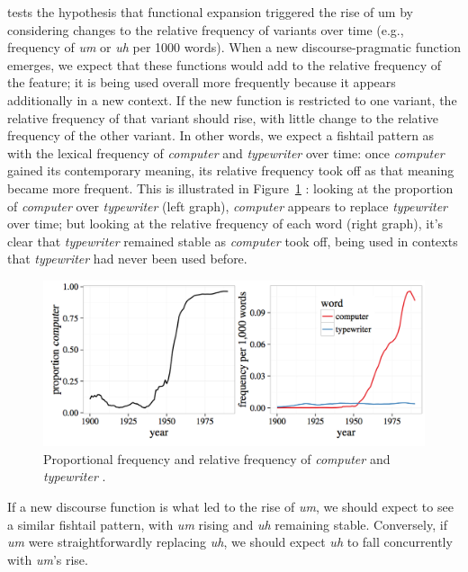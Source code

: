 \documentclass[11pt]{article}
\begin{document}
\textcite{fruehwald2016} tests the hypothesis that functional expansion
triggered the rise of um by considering changes to the relative frequency of
variants over time (e.g., frequency of \emph{um} or \emph{uh} per 1000 words).
When a new discourse-pragmatic function emerges, we expect that these functions
would add to the relative frequency of the feature; it is being used overall
more frequently because it appears additionally in a new context.
If the new function is restricted to one variant, the relative frequency of that
variant should rise, with little change to the relative frequency of the other
variant.
In other words, we expect a fishtail pattern as with the lexical frequency of
\emph{computer} and \emph{typewriter} over time: once \emph{computer} gained its
contemporary meaning, its relative frequency took off as that meaning became
more frequent.
This is illustrated in Figure~\ref{fig:fishtail} \parencite[Figure 3
from][]{fruehwald2016}: looking at the proportion of \emph{computer} over
\emph{typewriter} (left graph), \emph{computer} appears to replace
\emph{typewriter} over time; but looking at the relative frequency of each word
(right graph), it's clear that \emph{typewriter} remained stable as
\emph{computer} took off, being used in contexts that \emph{typewriter} had
never been used before.

\begin{figure}[htpb]
    \centering
    \includegraphics[width=0.8\linewidth]{figures/fishtail.png}
    \caption{Proportional frequency and relative frequency of \emph{computer}
    and \emph{typewriter} \parencite[Figure 3 from][]{fruehwald2016}.}
    \label{fig:fishtail}
\end{figure}

If a new discourse function is what led to the rise of \emph{um}, we should
expect to see a similar fishtail pattern, with \emph{um} rising and \emph{uh}
remaining stable.
Conversely, if \emph{um} were straightforwardly replacing \emph{uh}, we should
expect \emph{uh} to fall concurrently with \emph{um}'s rise.
\end{document}
